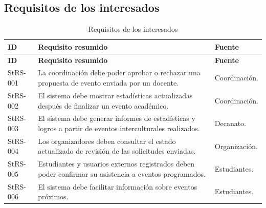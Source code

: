 \subsection{Requisitos de los interesados}
\begin{longtable}{P{0.13\textwidth} P{0.59\textwidth} P{0.18\textwidth}}
\caption{Requisitos de los interesados}\\
\toprule
\textbf{ID} & \textbf{Requisito resumido} & \textbf{Fuente}\\
\midrule
\endfirsthead
\toprule
\textbf{ID} & \textbf{Requisito resumido} & \textbf{Fuente}\\
\midrule
\endhead
StRS-001 & La coordinación debe poder aprobar o rechazar una propuesta de evento enviada por un docente. & Coordinación.\\
StRS-002 & El sistema debe mostrar estadísticas actualizadas después de finalizar un evento académico. & Coordinación.\\
StRS-003 & El sistema debe generar informes de estadísticas y logros a partir de eventos interculturales realizados. & Decanato.\\
StRS-004 & Los organizadores deben consultar el estado actualizado de revisión de las solicitudes enviadas. & Organización.\\
StRS-005 & Estudiantes y usuarios externos registrados deben poder confirmar su asistencia a eventos programados. & Estudiantes.\\
StRS-006 & El sistema debe facilitar información sobre eventos próximos. & Estudiantes.\\
\bottomrule
\end{longtable}

